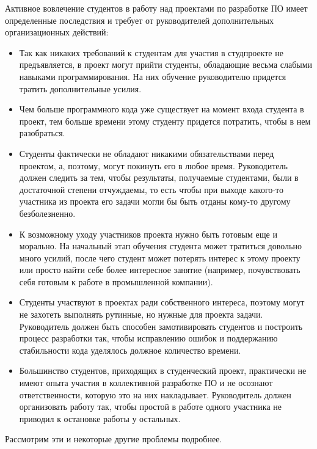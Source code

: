 \documentclass[a4paper]{article}
\begin{document}
Активное вовлечение студентов в работу над проектами по разработке ПО имеет определенные последствия и требует от руководителей дополнительных организационных действий:
\begin{itemize}
 \item Так как никаких требований к студентам для участия в студпроекте не предъявляется, в проект могут прийти студенты, обладающие весьма слабыми навыками программирования. На них обучение руководителю придется тратить дополнительные усилия. 
 \item Чем больше программного кода уже существует на момент входа студента в проект, тем больше времени этому студенту придется потратить, чтобы в нем разобраться.
 \item Студенты фактически не обладают никакими обязательствами перед проектом, а, поэтому, могут покинуть его в любое время. Руководитель должен следить за тем, чтобы результаты, получаемые студентами, были в достаточной степени отчуждаемы, то есть чтобы при выходе какого-то участника из проекта его задачи могли бы быть отданы кому-то другому безболезненно.
 \item К возможному уходу участников проекта нужно быть готовым еще и морально. На начальный этап обучения студента может тратиться довольно много усилий, после чего студент может потерять интерес к этому проекту или просто найти себе более интересное занятие (например, почувствовать себя готовым к работе в промышленной компании). 
 \item Студенты участвуют в проектах ради собственного интереса, поэтому могут не захотеть выполнять рутинные, но нужные для проекта задачи. Руководитель должен быть способен замотивировать студентов и построить процесс разработки так, чтобы исправлению ошибок и поддержанию стабильности кода уделялось должное количество времени. 
 \item Большинство студентов, приходящих в студенческий проект, практически не имеют опыта участия в коллективной разработке ПО и не осознают ответственности, которую это на них накладывает. Руководитель должен организовать работу так, чтобы простой в работе одного участника не приводил к остановке работы у остальных. 
\end{itemize}
Рассмотрим эти и некоторые другие проблемы подробнее.
\end{document}
